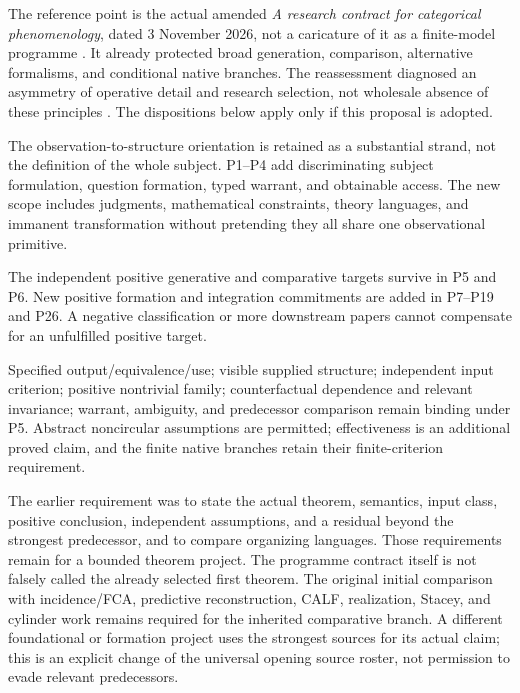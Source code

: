 \documentclass[11pt]{article}
\theoremstyle{definition}
\begin{document}
The reference point is the actual amended \emph{A research contract for categorical phenomenology}, dated 3 November 2026, not a caricature of it as a finite-model programme \cite{Earlier}. It already protected broad generation, comparison, alternative formalisms, and conditional native branches. The reassessment diagnosed an asymmetry of operative detail and research selection, not wholesale absence of these principles \cite{Reassessment}. The dispositions below apply only if this proposal is adopted.

\begin{description}[style=nextline,leftmargin=0pt]
\item[Subject \quad broadened]
The observation-to-structure orientation is retained as a substantial strand, not the definition of the whole subject. P1--P4 add discriminating subject formulation, question formation, typed warrant, and obtainable access. The new scope includes judgments, mathematical constraints, theory languages, and immanent transformation without pretending they all share one observational primitive.

\item[Paired positive commitments \quad carried and enlarged]
The independent positive generative and comparative targets survive in P5 and P6. New positive formation and integration commitments are added in P7--P19 and P26. A negative classification or more downstream papers cannot compensate for an unfulfilled positive target.

\item[The six generative nonvacuity requirements \quad carried]
Specified output/equivalence/use; visible supplied structure; independent input criterion; positive nontrivial family; counterfactual dependence and relevant invariance; warrant, ambiguity, and predecessor comparison remain binding under P5. Abstract noncircular assumptions are permitted; effectiveness is an additional proved claim, and the finite native branches retain their finite-criterion requirement.

\item[Gate A \quad rigor retained and selection broadened]
The earlier requirement was to state the actual theorem, semantics, input class, positive conclusion, independent assumptions, and a residual beyond the strongest predecessor, and to compare organizing languages. Those requirements remain for a bounded theorem project. The programme contract itself is not falsely called the already selected first theorem. The original initial comparison with incidence/FCA, predictive reconstruction, CALF, realization, Stacey, and cylinder work remains required for the inherited comparative branch. A different foundational or formation project uses the strongest sources for its actual claim; this is an explicit change of the universal opening source roster, not permission to evade relevant predecessors.


\end{description}
\end{document}
